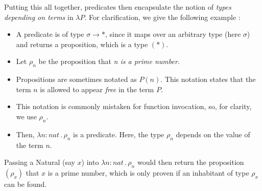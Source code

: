 \documentclass[9pt,preprint,nocopyrightspace,computermodern]{sigplanconf} %
\begin{document}
Putting this all together, predicates then encapsulate the notion of
\textit{types depending on terms} in \(\lambda P\). For clarification, we give the
following example \cite{rng}:
\begin{itemize}
\item A predicate is of type \(\sigma\rightarrow *\), since it maps over an arbitrary type
  (here \(\sigma\)) and returns a proposition, which is a type \((*)\).
\item Let \(\rho_n\) be the proposition that \textit{n is a prime number}.
\item Propositions are sometimes notated as \(P(n)\). This notation states that the term
  \(n\) is allowed to appear \textit{free} in the term \(P\).
\item This notation is commonly mistaken for function invocation, so, for clarity, we use \(\rho_n\).
\item Then, \(\lambda n : nat\,.\,\rho_n\) is a predicate. Here, the type \(\rho_n\) depends
  on the value of the term \(n\).
\end{itemize}
Passing a Natural (say \(x\)) into \(\lambda n : nat\,.\,\rho_n\) would then return the
proposition \((\rho_x)\) that \(x\) is a prime number, which is only proven if an inhabitant
of type \(\rho_x\) can be found.
\end{document}
